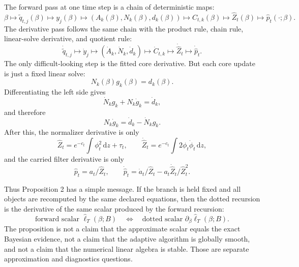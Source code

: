 \documentclass[11pt]{article}
\numberwithin{equation}{section}
\newcommand{\dd}{\,\mathrm d}
\newcommand{\widehatell}{\widehat\ell}
\begin{document}
The forward pass at one time step is a chain of deterministic maps:
\begin{equation}
    \beta
    \mapsto
    \widetilde q_{t,j}(\beta)
    \mapsto
    y_j(\beta)
    \mapsto
    (A_k(\beta),N_k(\beta),d_k(\beta))
    \mapsto
    C_{t,k}(\beta)
    \mapsto
    \widehat Z_t(\beta)
    \mapsto
    \widehat p_t(\cdot;\beta).
    \label{eq:p26-deriv-story-4}
\end{equation}
The derivative pass follows the same chain with the product rule, chain rule,
linear-solve derivative, and quotient rule:
\begin{equation}
    \dot{\widetilde q}_{t,j}
    \mapsto
    \dot y_j
    \mapsto
    (\dot A_k,\dot N_k,\dot d_k)
    \mapsto
    \dot C_{t,k}
    \mapsto
    \dot{\widehat Z}_t
    \mapsto
    \dot{\widehat p}_t.
    \label{eq:p26-deriv-story-5}
\end{equation}
The only difficult-looking step is the fitted core derivative.  But each core
update is just a fixed linear solve:
\begin{equation}
    N_k(\beta)g_k(\beta)=d_k(\beta).
    \label{eq:p26-deriv-story-6}
\end{equation}
Differentiating the left side gives
\begin{equation}
    \dot N_k g_k+N_k\dot g_k=\dot d_k,
    \label{eq:p26-deriv-story-7}
\end{equation}
and therefore
\begin{equation}
    N_k\dot g_k=\dot d_k-\dot N_kg_k.
    \label{eq:p26-deriv-story-8}
\end{equation}
After this, the normalizer derivative is only
\begin{equation}
    \widehat Z_t=e^{-c_t}\int\phi_t^2\dd z+\tau_t,
    \qquad
    \dot{\widehat Z}_t=e^{-c_t}\int2\phi_t\dot\phi_t\dd z,
    \label{eq:p26-deriv-story-9}
\end{equation}
and the carried filter derivative is only
\begin{equation}
    \widehat p_t=a_t/\widehat Z_t,
    \qquad
    \dot{\widehat p}_t
    =
    \dot a_t/\widehat Z_t
    -
    a_t\dot{\widehat Z}_t/\widehat Z_t^2.
    \label{eq:p26-deriv-story-10}
\end{equation}

Thus Proposition 2 has a simple message.  If the branch is held fixed and all
objects are recomputed by the same declared equations, then the dotted
recursion is the derivative of the same scalar produced by the forward
recursion:
\begin{equation}
    \text{forward scalar } \widehatell_T(\beta;B)
    \quad\Longleftrightarrow\quad
    \text{dotted scalar } \partial_\beta\widehatell_T(\beta;B).
    \label{eq:p26-deriv-story-11}
\end{equation}
The proposition is not a claim that the approximate scalar equals the exact
Bayesian evidence, not a claim that the adaptive algorithm is globally smooth,
and not a claim that the numerical linear algebra is stable.  Those are
separate approximation and diagnostics questions.
\end{document}
